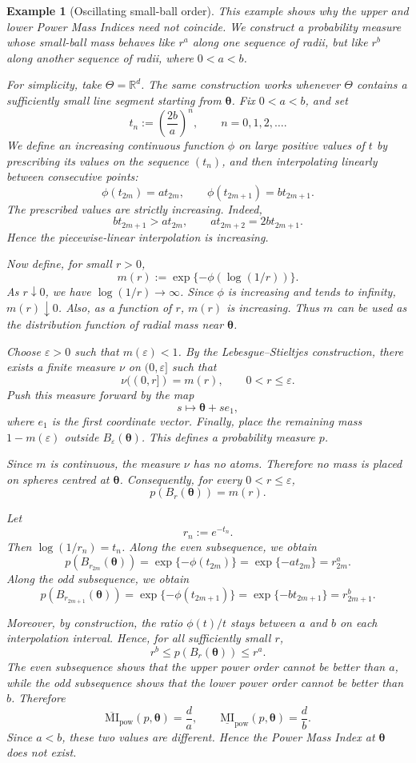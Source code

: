 \documentclass[11pt,a4paper]{article}
\newcommand{\MI}{\mathrm{MI}}
\newcommand{\pa}{\boldsymbol\theta}
\theoremstyle{compactplain}
\theoremstyle{compactdefinition}
\newtheorem{example}[theorem]{Example}
\numberwithin{equation}{section}
\begin{document}
\begin{example}[Oscillating small-ball order]
\label{exp:osc}
This example shows why the upper and lower Power Mass Indices need not
coincide. We construct a probability measure whose small-ball mass behaves
like \(r^a\) along one sequence of radii, but like \(r^b\) along another
sequence of radii, where \(0<a<b\).

For simplicity, take \(\Theta=\mathbb R^d\). The same construction works
whenever \(\Theta\) contains a sufficiently small line segment starting from
\(\pa\). Fix \(0<a<b\), and set
\[
t_n:=\left(\frac{2b}{a}\right)^n,
\qquad n=0,1,2,\ldots .
\]
We define an increasing continuous function \(\phi\) on large positive
values of \(t\) by prescribing its values on the sequence \((t_n)\), and
then interpolating linearly between consecutive points:
\[
\phi(t_{2m})=a t_{2m},
\qquad
\phi(t_{2m+1})=b t_{2m+1}.
\]
The prescribed values are strictly increasing. Indeed,
\[
b t_{2m+1}>a t_{2m},
\qquad
a t_{2m+2}=2b t_{2m+1}.
\]
Hence the piecewise-linear interpolation is increasing.

Now define, for small \(r>0\),
\[
m(r):=\exp\{-\phi(\log(1/r))\}.
\]
As \(r\downarrow0\), we have \(\log(1/r)\to\infty\). Since \(\phi\) is
increasing and tends to infinity, \(m(r)\downarrow0\). Also, as a function
of \(r\), \(m(r)\) is increasing. Thus \(m\) can be used as the distribution
function of radial mass near \(\pa\).

Choose \(\varepsilon>0\) such that \(m(\varepsilon)<1\). By the
Lebesgue--Stieltjes construction, there exists a finite measure \(\nu\) on
\((0,\varepsilon]\) such that
\[
\nu((0,r])=m(r),
\qquad 0<r\le \varepsilon .
\]
Push this measure forward by the map
\[
s\mapsto \pa+s e_1,
\]
where \(e_1\) is the first coordinate vector. Finally, place the remaining
mass \(1-m(\varepsilon)\) outside \(B_\varepsilon(\pa)\). This defines a
probability measure \(p\).

Since \(m\) is continuous, the measure \(\nu\) has no atoms. Therefore no
mass is placed on spheres centred at \(\pa\). Consequently, for every
\(0<r\le \varepsilon\),
\[
p(B_r(\pa))=m(r).
\]

Let
\[
r_n:=e^{-t_n}.
\]
Then \(\log(1/r_n)=t_n\). Along the even subsequence, we obtain
\[
p(B_{r_{2m}}(\pa))
=
\exp\{-\phi(t_{2m})\}
=
\exp\{-a t_{2m}\}
=
r_{2m}^a.
\]
Along the odd subsequence, we obtain
\[
p(B_{r_{2m+1}}(\pa))
=
\exp\{-\phi(t_{2m+1})\}
=
\exp\{-b t_{2m+1}\}
=
r_{2m+1}^b.
\]

Moreover, by construction, the ratio \(\phi(t)/t\) stays between \(a\) and
\(b\) on each interpolation interval. Hence, for all sufficiently small
\(r\),
\[
r^b
\le
p(B_r(\pa))
\le
r^a .
\]
The even subsequence shows that the upper power order cannot be better than
\(a\), while the odd subsequence shows that the lower power order cannot be
better than \(b\). Therefore
\[
\overline{\MI}_{\mathrm{pow}}(p,\pa)=\frac{d}{a},
\qquad
\underline{\MI}_{\mathrm{pow}}(p,\pa)=\frac{d}{b}.
\]
Since \(a<b\), these two values are different. Hence the Power Mass Index at
\(\pa\) does not exist.
\end{example}
\end{document}
